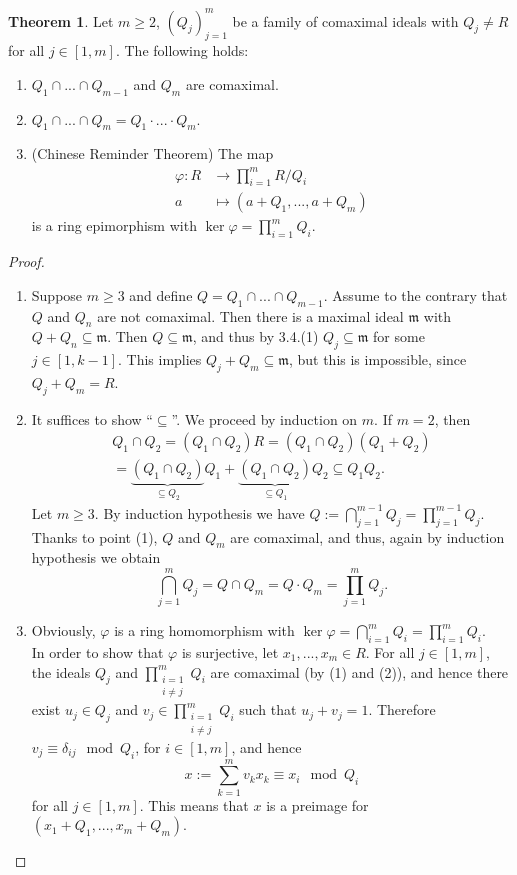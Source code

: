 \documentclass[12pt,a4paper]{report}
\theoremstyle{definition}
\newtheorem{theorem}{Theorem}[chapter] %
\theoremstyle{num.custom-title}
\DeclareMathOperator{\sse}{\subseteq}
\newcommand{\m}{\mathfrak{m}}
\renewcommand{\phi}{\varphi}
\begin{document}
\begin{theorem}
Let $m \geq 2$, $(Q_j)_{j=1}^m$ be a family of comaximal ideals with $Q_j \neq R$ for all $j \in [1,m]$. The following holds:
\begin{enumerate}
\item $Q_1 \cap ... \cap Q_{m-1}$ and $Q_m$ are comaximal.
\item $Q_1 \cap ... \cap Q_m = Q_1 \cdot ... \cdot Q_m$.
\item (Chinese Reminder Theorem) The map
\begin{align*}
  \phi \colon R &\to \prod_{i=1}^m R/Q_i\\
   a &\mapsto (a+Q_1,...,a+Q_m)
\end{align*}
is a ring epimorphism with $\ker \phi = \prod_{i=1}^m Q_i$.
\end{enumerate}
\begin{proof}\ 
\begin{enumerate}
\item Suppose $m \geq 3$ and define $Q=Q_1 \cap ... \cap Q_{m-1}$. Assume to the contrary that $Q$ and $Q_n$ are not comaximal. Then there is a maximal ideal $\m$ with $Q+Q_n \sse \m$. Then $Q \sse \m$, and thus by 3.4.(1) $Q_j \sse \m$ for some $j \in [1,k-1]$. This implies $Q_j+Q_m \sse \m$, but this is impossible, since $Q_j+Q_m=R$.
\item It suffices to show ``$\sse$''. We proceed by induction on $m$. If $m=2$, then 
\begin{multline*}
Q_1 \cap Q_2 = (Q_1 \cap Q_2) R = (Q_1 \cap Q_2) (Q_1+Q_2) \\ = \underbrace{(Q_1 \cap Q_2)}_{\sse Q_2} Q_1 + \underbrace{(Q_1 \cap Q_2)}_{\sse Q_1} Q_2 \sse Q_1Q_2.
\end{multline*}
Let $m \geq 3$. By induction hypothesis we have $Q:= \bigcap_{j=1}^{m-1} Q_j = \prod_{j=1}^{m-1} Q_j$. Thanks to point (1), $Q$ and $Q_m$ are comaximal, and thus, again by induction hypothesis we obtain
\[
\bigcap_{j=1}^m Q_j = Q \cap Q_m = Q \cdot Q_m = \prod_{j=1}^m Q_j.
\]
\item Obviously, $\phi$ is a ring homomorphism with $\ker \phi = \bigcap_{i=1}^m Q_i = \prod_{i=1}^m Q_i$.\\
In order to show that $\phi$ is surjective, let $x_1,...,x_m \in R$. For all $j \in [1,m]$, the ideals $Q_j$ and $\prod_{\substack{i=1\\ i \neq j}}^m Q_i$ are comaximal (by (1) and (2)), and hence there exist $u_j \in Q_j$ and $v_j \in \prod_{\substack{i=1\\ i \neq j}}^m Q_i$ such that $u_j+v_j=1$. Therefore $v_j \equiv \delta_{ij} \mod Q_i$, for $i \in [1,m]$, and hence 
\[
x:= \sum_{k=1}^m v_k x_k \equiv x_i \mod Q_i
\]
for all $j \in [1,m]$. This means that $x$ is a preimage for $(x_1+Q_1,...,x_m+Q_m)$.
\end{enumerate}
\end{proof}
\end{theorem}
\end{document}
